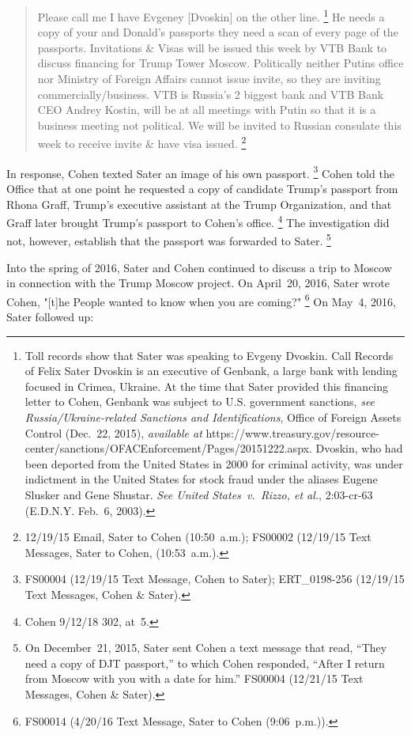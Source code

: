 \begin{quote}
Please call me I have Evgeney [Dvoskin] on the other line.%
\footnote{Toll records show that Sater was speaking to Evgeny Dvoskin.
Call Records of Felix Sater
Dvoskin is an executive of Genbank, a large bank with lending focused in Crimea, Ukraine.
At the time that Sater provided this financing letter to Cohen, Genbank was subject to U.S. government sanctions,
\textit{see Russia/Ukraine-related Sanctions and Identifications}, Office of Foreign Assets Control (Dec.~22, 2015), \textit{available at} https://www.treasury.gov/resource-center/sanctions/OFACEnforcement/Pages/20151222.aspx.
Dvoskin, who had been deported from the United States in 2000 for criminal activity, was under indictment in the United States for stock fraud under the aliases Eugene Slusker and Gene Shustar.
\textit{See United States~v.\ Rizzo, et al.}, 2:03-cr-63 (E.D.N.Y. Feb.~6, 2003).}
He needs a copy of your and Donald's passports they need a scan of every page of the passports.
Invitations \& Visas will be issued this week by VTB Bank to discuss financing for Trump Tower Moscow. Politically neither Putins office nor Ministry of Foreign Affairs cannot issue invite, so they are inviting commercially/business.
VTB is Russia's 2 biggest bank and VTB Bank CEO Andrey Kostin, will be at all meetings with Putin so that it is a business meeting not political.
We will be invited to Russian consulate this week to receive invite \& have visa issued.%
\footnote{12/19/15 Email, Sater to Cohen (10:50~a.m.);
FS00002 (12/19/15 Text Messages, Sater to Cohen, (10:53~a.m.).}
\end{quote}

In response, Cohen texted Sater an image of his own passport.%
\footnote{FS00004 (12/19/15 Text Message, Cohen to Sater);
ERT\_0198-256 (12/19/15 Text Messages, Cohen \& Sater).}
Cohen told the Office that at one point he requested a copy of candidate Trump's passport from Rhona Graff, Trump's executive assistant at the Trump Organization, and that Graff later brought Trump's passport to Cohen's office.%
\footnote{Cohen 9/12/18 302, at~5.}
The investigation did not, however, establish that the passport was forwarded to Sater.%
\footnote{On December~21, 2015, Sater sent Cohen a text message that read, ``They need a copy of DJT passport,'' to which Cohen responded, ``After I return from Moscow with you with a date for him.''
FS00004 (12/21/15 Text Messages, Cohen \& Sater).}

Into the spring of 2016, Sater and Cohen continued to discuss a trip to Moscow in connection with the Trump Moscow project.
On April~20, 2016, Sater wrote Cohen, "[t]he People wanted to know when you are coming?"%
\footnote{FS00014 (4/20/16 Text Message, Sater to Cohen (9:06~p.m.)).}
On May~4, 2016, Sater followed up:


